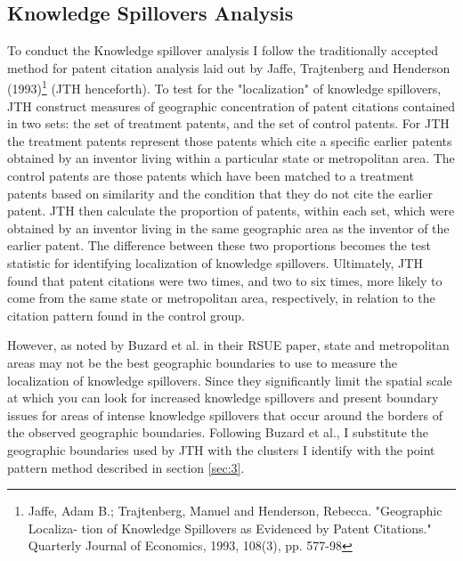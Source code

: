 \documentclass[12pt,letterpaper]{article}
\begin{document}
\subsection{Knowledge Spillovers Analysis}
To conduct the Knowledge spillover analysis I follow the traditionally accepted method for patent citation analysis laid out by Jaffe, Trajtenberg and Henderson (1993)\footnote{ Jaffe, Adam B.; Trajtenberg, Manuel and
 Henderson, Rebecca. "Geographic Localiza-
 tion of Knowledge Spillovers as Evidenced
 by Patent Citations." Quarterly Journal of
 Economics, 1993, 108(3), pp. 577-98} (JTH henceforth). To test for the "localization" of knowledge spillovers, JTH construct measures of geographic concentration of patent citations contained in two sets: the set of treatment patents, and the set of control patents. For JTH the treatment patents represent those patents which cite a specific earlier patents obtained by an inventor living within a particular state or metropolitan area. The control patents are those patents which have been matched to a treatment patents based on similarity and the condition that they do not cite the earlier patent. JTH then calculate the proportion of patents, within each set, which were obtained by an inventor living in the same geographic area as the inventor of the earlier patent. The difference between these two proportions becomes the test statistic for identifying localization of knowledge spillovers. Ultimately, JTH found that patent citations were two times, and two to six times, more likely to come from the same state or metropolitan area, respectively, in relation to the citation pattern found in the control group. 
\par 
However, as noted by Buzard et al. in their RSUE paper, state and metropolitan areas may not be the best geographic boundaries to use to measure the localization of knowledge spillovers. Since they significantly limit the spatial scale at which you can look for increased knowledge spillovers and present boundary issues for areas of intense knowledge spillovers that occur around the borders of the observed geographic boundaries. Following Buzard et al., I substitute the geographic boundaries used by JTH with the clusters I identify with the point pattern method described in section \ref{sec:3}. 
\end{document}
